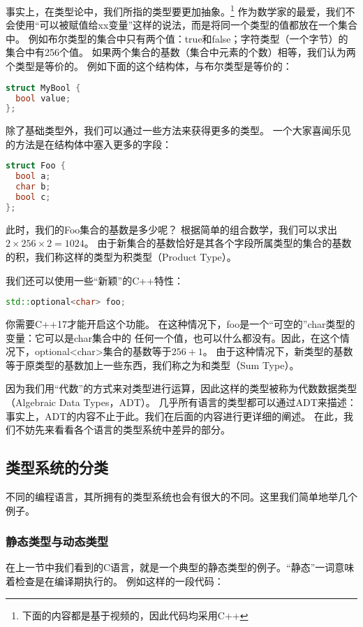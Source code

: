 \documentclass[../main.tex]{subfiles}
\begin{document}
  \indent 事实上，在类型论中，我们所指的类型要更加抽象。\footnote[1]{下面的内容都是基于\cite{typeytb}视频的，因此代码均采用C++}
  作为数学家的最爱，我们不会使用“可以被赋值给xx变量”这样的说法，而是将同一个类型的值都放在一个集合中\cite{typeytb}。
  例如布尔类型的集合中只有两个值：true和false；字符类型（一个字节）的集合中有256个值。
  如果两个集合的基数（集合中元素的个数）相等，我们认为两个类型是等价的。
  例如下面的这个结构体，与布尔类型是等价的：

\begin{lstlisting}[language=c++]
struct MyBool {
  bool value;
};
\end{lstlisting}

  \indent 除了基础类型外，我们可以通过一些方法来获得更多的类型。
  一个大家喜闻乐见的方法是在结构体中塞入更多的字段：

\begin{lstlisting}[language=c++]
struct Foo {
  bool a;
  char b;
  bool c;
};
\end{lstlisting}

  \indent 此时，我们的Foo集合的基数是多少呢？
  根据简单的组合数学，我们可以求出$2 \times 256 \times 2 = 1024$。
  由于新集合的基数恰好是其各个字段所属类型的集合的基数的积，我们称这样的类型为积类型（Product Type）。

  \indent 我们还可以使用一些“新颖”的C++特性：
\begin{lstlisting}[language=c++]
std::optional<char> foo;
\end{lstlisting}

  \indent 你需要C++17才能开启这个功能。
  在这种情况下，foo是一个“可空的”char类型的变量：它可以是char集合中的
  任何一个值，也可以什么都没有。因此，在这个情况下，optional<char>集合的基数等于$256 + 1$。
  由于这种情况下，新类型的基数等于原类型的基数加上一些东西，我们称之为和类型（Sum Type）。

  \indent 因为我们用“代数”的方式来对类型进行运算，因此这样的类型被称为代数数据类型（Algebraic Data Types，ADT）。
  几乎所有语言的类型都可以通过ADT来描述：事实上，ADT的内容不止于此。我们在后面的内容进行更详细的阐述。
  在此，我们不妨先来看看各个语言的类型系统中差异的部分。

  \subsection{类型系统的分类}
  \indent 不同的编程语言，其所拥有的类型系统也会有很大的不同。这里我们简单地举几个例子。

  \subsubsection*{静态类型与动态类型}
  \indent 在上一节中我们看到的C语言，就是一个典型的静态类型的例子。“静态”一词意味着检查是在编译期执行的。
  例如这样的一段代码：
\end{document}
